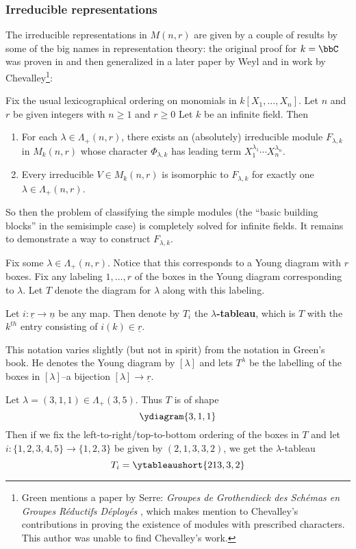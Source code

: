 \documentclass[12pt]{article}
\begin{document}
\subsubsection{Irreducible representations}
The irreducible representations in $M(n,r)$ are given by a couple of results by some of the big names in representation theory: the original proof for $k=\bbC$ was proven in \cite[p.37]{schur-thesis} and then 
generalized in a later paper by Weyl \cite{weyl} and in work by Chevalley\footnote{Green \cite{green} mentions a paper by Serre: \textit{Groupes de Grothendieck des Sch\'emas en Groupes R\'eductifs D\'eploy\'es} \cite{serre-chevalley}, which 
makes mention to Chevalley's contributions in proving the existence of modules with prescribed characters. This author was unable to find Chevalley's work.}:
\begin{thm}\label{thm:irreps}
	Fix the usual lexicographical ordering on monomials in $k[X_1,\dots,X_n]$. Let $n$ and $r$ be given integers with $n\ge 1$ and $r\ge 0$ Let $k$ be an infinite field. Then 
	\begin{enumerate}
		\item For each $\lambda\in\Lambda_+(n,r)$, there exists an (absolutely) irreducible module $F_{\lambda,k}$
		in $M_k(n,r)$ whose character $\Phi_{\lambda,k}$ has leading term $X_1^{\lambda_1}\cdots X_n^{\lambda_n}$.
		\item Every irreducible $V\in M_k(n,r)$ is isomorphic to $F_{\lambda,k}$ for exactly one $\lambda\in \Lambda_+(n,r)$.
	\end{enumerate}
\end{thm}
So then the problem of classifying the simple modules (the ``basic building blocks'' in the semisimple case) is completely solved for infinite fields.
It remains to demonstrate a way to construct $F_{\lambda,k}$.
\begin{defn}
	Fix some $\lambda\in \Lambda_+(n,r)$. Notice that this corresponds to a Young diagram with $r$ boxes. Fix any labeling $1,\dots,r$ of the boxes in the 
	Young diagram corresponding to $\lambda$. Let $T$ denote the diagram for $\lambda$ along with this labeling.
	
	Let $i:\underline r\to\underline n$ be any map. Then denote by $T_i$ the \textbf{$\lambda$-tableau}, which is $T$ with the $k^{th}$ entry consisting of $i(k)\in\underline r$.
\end{defn}
\begin{rmk}
	This notation varies slightly (but not in spirit) from the notation in Green's book. He denotes the Young diagram by $[\lambda]$ and lets $T^\lambda$ be 
	the labelling of the boxes in $[\lambda]$--a bijection $[\lambda]\to\underline r$.
\end{rmk}
\begin{ex}
	Let $\lambda=(3,1,1)\in\Lambda_+(3,5)$. Thus $T$ is of shape 
	\[\ydiagram{3,1,1}\]
	Then if we fix the left-to-right/top-to-bottom ordering of the boxes in $T$ and let $i:\{1,2,3,4,5\}\to\{1,2,3\}$
	be given by $(2,1,3,3,2)$, we get the $\lambda$-tableau 
	\[T_i=\ytableaushort{2 1 3, 3, 2}\]
\end{ex}
\end{document}
